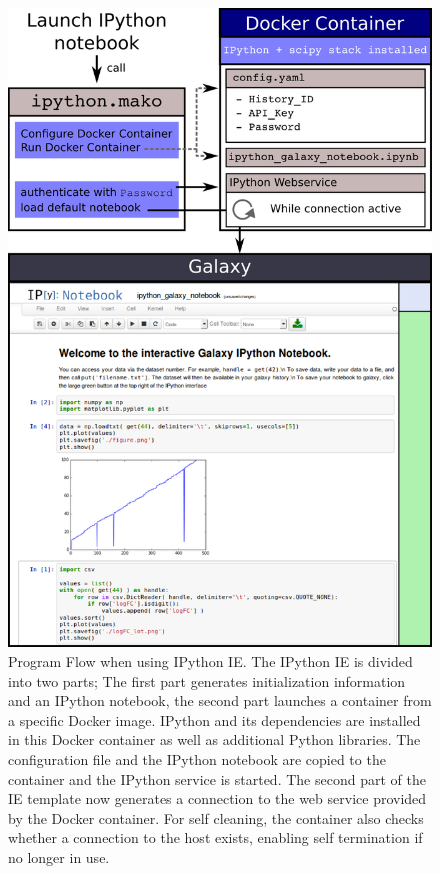 \documentclass{bioinfo}
\begin{document}
\begin{methods}
\begin{figure}[!tpb]
    \centerline{\includegraphics[width=.48\textwidth]{diagram.png}}
\caption{Program Flow when using IPython IE. The IPython IE is divided into two parts;
The first part generates initialization information and an IPython notebook, the second part launches a container
from a specific Docker image. IPython and its dependencies are installed in this Docker container as well as additional Python
libraries. The configuration file and the IPython notebook are copied to the container and the IPython service is started.
The second part of the IE template now generates a connection to the web service provided by the Docker container.
For self cleaning, the container also checks whether a connection to the host exists, enabling self termination 
if no longer in use.}
\label{fig:diagram}
\end{figure}


\end{methods}
\end{document}
